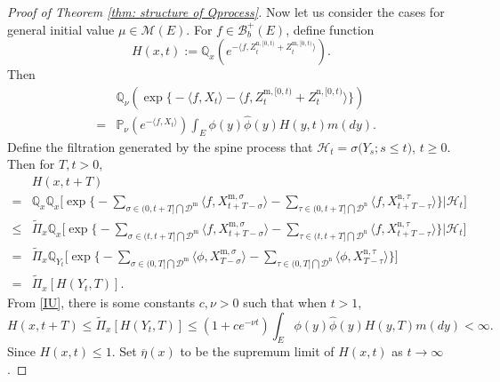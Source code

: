 \documentclass[12pt,a4paper]{amsart}
\theoremstyle{plain}
\theoremstyle{definition}
\numberwithin{equation}{section}
\begin{document}
\begin{proof}[Proof of Theorem \ref{thm: structure of Qprocess}]
Now let us consider the cases for general initial value $\mu\in\mathcal M(E)$.  For $f\in\mathcal B_b^+(E)$, define function
\begin{equation}\label{def: H}
H(x,t):={\mathbb Q}_x\left(e^{-\langle f, Z^{\mathrm n, [0,t)}_{t} + Z^{\mathrm m, [0,t)}_{t}\rangle }\right).
\end{equation}
Then
\begin{eqnarray*}
&&\mathbb Q_\nu\left(\exp\Big\{-\langle f, X_t\rangle-\langle f, Z^{{\mathrm m},[0,t)}_t+Z^{{\mathrm n},[0,t)}_t\rangle \Big\}\right)\\
&=&\mathbb P_\nu\left(e^{-\langle f, X_t\rangle}\right)\int_E\phi(y)\hat\phi(y)H(y,t)m(dy).
\end{eqnarray*}
Define the filtration generated by the spine process that $\mathcal{H}_t=\sigma\big(Y_s; s\leq t\big)$, $t\geq 0$.  Then for $T,t>0$,
\begin{equation}\label{subcritical upper bound}
 \begin{aligned}
 &H(x,t+T)\\
 =&\mathbb Q_{x}\mathbb Q_{x}\Big[\exp\Big\{-\sum_{\sigma\in (0, t+T]\bigcap \mathcal D^{\mathrm m}}\langle f, X_{t+T-\sigma}^{{\mathrm m},\sigma}\rangle -\sum_{\tau\in (0, t+T]\bigcap \mathcal D^{\mathrm n}}\langle f, X_{t+T-\tau}^{{\mathrm n}, \tau}\rangle \Big\}\Big| \mathcal H_t\Big]\\
 \leq&\widetilde\Pi_x\mathbb Q_{x}\Big[\exp\Big\{-\sum_{\sigma\in (t, t+T]\bigcap \mathcal D^{\mathrm m}}\langle f, X_{t+T-\sigma}^{{\mathrm m},\sigma}\rangle -\sum_{\tau\in (t, t+T]\bigcap \mathcal D^{\mathrm n}}\langle f, X_{t+T-\tau}^{{\mathrm n}, \tau}\rangle \Big\}\Big| \mathcal H_t\Big]\\
 =&
  \widetilde\Pi_x\mathbb Q_{Y_t}\Big[\exp\Big\{-\sum_{\sigma\in (0, T]\bigcap \mathcal D^{\mathrm m}}\langle \phi, X_{T-\sigma}^{{\mathrm m},\sigma}\rangle -\sum_{\tau\in (0, T]\bigcap \mathcal D^{\mathrm n}}\langle \phi, X_{T-\tau}^{{\mathrm n}, \tau}\rangle \Big\}\Big]\\
 =&\widetilde\Pi_x\left[ H(Y_t, T)\right].
 \end{aligned}
 \end{equation}
 From \eqref{IU}, there is some constants $c,\nu>0$ such that when $t>1$,
\[
 H(x,t+T)\leq \widetilde\Pi_x\left[ H(Y_t, T)\right]\leq (1+ce^{-\nu t})\int_E\phi(y)\hat\phi(y)H(y,T)m(dy)<\infty.
 \]
Since $H(x,t)\leq 1$.  Set $\overline \eta(x)$ to be the supremum limit of $H(x,t)$ as $t\to \infty$.

\end{proof}
\end{document}
